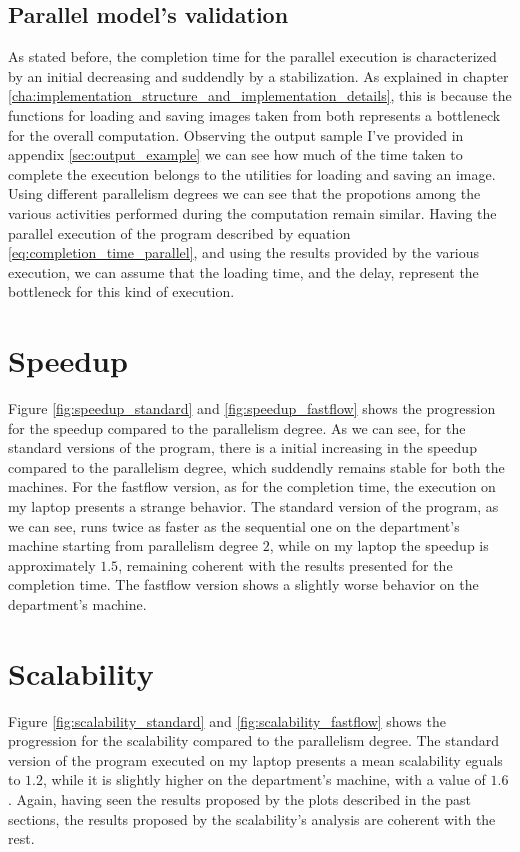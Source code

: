         \subsection{Parallel model's validation} %
        \label{sub:parallel_model_s_validation}
            As stated before, the completion time for the parallel execution is characterized by an initial
            decreasing and suddendly by a stabilization. As explained in chapter
            \ref{cha:implementation_structure_and_implementation_details}, this is because the functions for
            loading and saving images taken from \cite{cimg} both represents a bottleneck for
            the overall computation. Observing the output sample I've provided in appendix
            \ref{sec:output_example} we can see how much of the time taken to complete the execution belongs to
            the utilities for loading and saving an image. Using different parallelism degrees we can see that
            the propotions among the various activities performed during the computation remain similar.
            Having the parallel execution of the program described by equation
            \ref{eq:completion_time_parallel}, and using the results provided by the various execution, we
            can assume that the loading time, and the delay, represent the bottleneck for this kind of
            execution.
    \section{Speedup} %
    \label{sec:speedup}
        Figure \ref{fig:speedup_standard} and \ref{fig:speedup_fastflow} shows the progression for the speedup
        compared to the parallelism degree. As we can see, for the standard versions of the program, there is a
        initial increasing in the speedup compared to the parallelism degree, which suddendly remains stable
        for both the machines. For the fastflow version, as for the completion time, the execution on my laptop
        presents a strange behavior. The standard version of the program, as we can see, runs twice as faster
        as the sequential one on the department's machine starting from parallelism degree $2$, while on my
        laptop the speedup is approximately $1.5$, remaining coherent with the results presented for the
        completion time. The fastflow version shows a slightly worse behavior on the department's machine.
    \section{Scalability} %
    \label{sec:scalability}
        Figure \ref{fig:scalability_standard} and \ref{fig:scalability_fastflow} shows the progression for the
        scalability compared to the parallelism degree. The standard version of the program executed on my
        laptop presents a mean scalability eguals to $1.2$, while it is slightly higher on the department's
        machine, with a value of $1.6$. Again, having seen the results proposed by the plots described in the
        past sections, the results proposed by the scalability's analysis are coherent with the rest.
